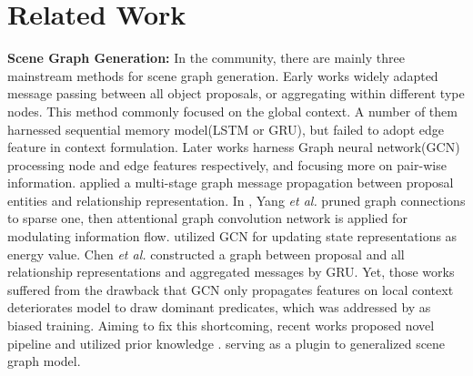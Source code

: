 \documentclass[runningheads]{llncs}
\begin{document}
\section{Related Work}
\textbf{Scene Graph Generation:} In the community, there are mainly three
mainstream methods for scene graph generation. Early works widely adapted
message passing between all object
proposals\cite{drnet}\cite{Gps-net}\cite{mem}\cite{linknet}\cite{factorizable}\cite{structure},
or aggregating within different type nodes\cite{phrases}. This method commonly
focused on the global context. A number of them\cite{motif}\cite{phrases}
harnessed sequential memory model(LSTM\cite{lstm} or GRU\cite{gru}), but failed
to adopt edge feature in context formulation. Later
works\cite{bgnn}\cite{energy}\cite{grcnn} harness Graph neural
network(GCN\cite{gcn}) processing node and edge features respectively, and
focusing more on pair-wise information.\cite{bgnn} applied a multi-stage graph
message propagation between proposal entities and relationship representation.
In \cite{grcnn}, Yang \textit{et al.} pruned graph connections to sparse one,
then attentional graph convolution network is applied for modulating
information flow. \cite{energy} utilized GCN for updating state representations
as energy value.  Chen \textit{et al.}\cite{kern} constructed a graph between
proposal and all relationship representations and aggregated messages by GRU.
Yet, those works suffered from the drawback that GCN only propagates features
on local context deteriorates model to draw dominant predicates, which was
addressed by\cite{unbias} as biased training. Aiming to fix this shortcoming,
recent works proposed novel pipeline and utilized prior knowledge
\cite{unbias}\cite{fully}\cite{pcpl}\cite{unconditional}\cite{recovering}\cite{attention-translation}.
serving as a plugin to generalized scene graph model.
\end{document}
